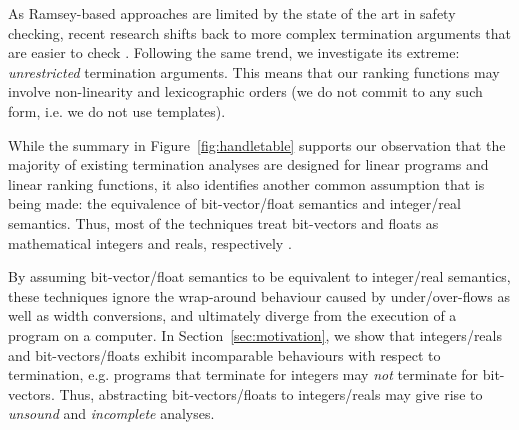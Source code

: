 \documentclass[preprint]{sigplanconf}
\theoremstyle{definition}
\begin{document}
As Ramsey-based approaches are limited by the state of the art in safety checking, 
recent research shifts back to more complex termination arguments that are easier to check \cite{DBLP:conf/tacas/CookSZ13,DBLP:conf/cav/KroeningSTW10}.
%
%
Following the same trend, %
we investigate its extreme: \emph{unrestricted} termination arguments. 
This means that our ranking functions may involve non-linearity and lexicographic orders (we do not commit to any such form, i.e. we do not use templates).


While the summary  in Figure~\ref{fig:handletable} supports our observation that the majority of existing termination analyses are designed for
linear programs and linear ranking functions, it also identifies another common assumption that is being made: the equivalence of bit-vector/float semantics and integer/real semantics. Thus, most of the techniques treat
bit-vectors and floats as mathematical integers and reals, respectively  \cite{DBLP:conf/pldi/CookPR06,DBLP:conf/popl/Ben-AmramG13,DBLP:conf/vmcai/P04,DBLP:conf/atva/HeizmannHLP13,DBLP:conf/vmcai/BradleyMS05,DBLP:conf/cav/KroeningSTW10}. 


By assuming bit-vector/float semantics to be equivalent to integer/real semantics, 
these techniques ignore the wrap-around behaviour caused by under/over-flows as well as width conversions, 
and ultimately diverge from the execution of a program on a computer.  
In Section~\ref{sec:motivation}, we show that integers/reals and bit-vectors/floats exhibit
incomparable behaviours with respect to termination, e.g.
programs that terminate for integers may \emph{not} terminate for bit-vectors.
Thus, abstracting bit-vectors/floats to integers/reals may give rise to 
{\em unsound} and {\em incomplete} analyses.



\end{document}

